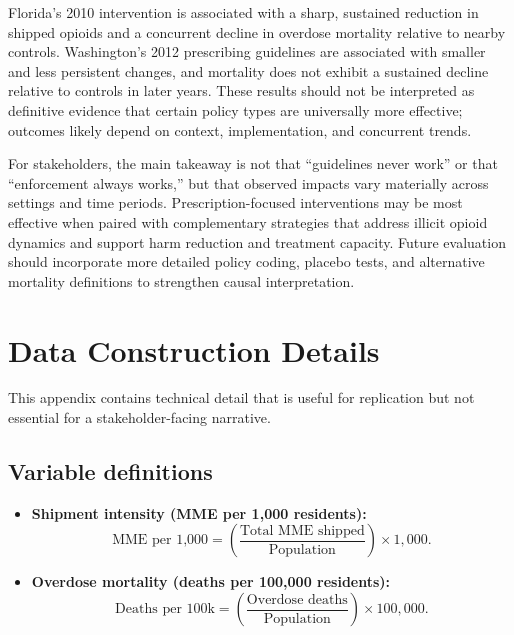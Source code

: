 \documentclass[11pt]{article}
\begin{document}
Florida's 2010 intervention is associated with a sharp, sustained reduction in shipped opioids and a concurrent decline in overdose mortality relative to nearby controls. Washington's 2012 prescribing guidelines are associated with smaller and less persistent changes, and mortality does not exhibit a sustained decline relative to controls in later years. These results should not be interpreted as definitive evidence that certain policy types are universally more effective; outcomes likely depend on context, implementation, and concurrent trends.

For stakeholders, the main takeaway is not that ``guidelines never work'' or that ``enforcement always works,'' but that observed impacts vary materially across settings and time periods. Prescription-focused interventions may be most effective when paired with complementary strategies that address illicit opioid dynamics and support harm reduction and treatment capacity. Future evaluation should incorporate more detailed policy coding, placebo tests, and alternative mortality definitions to strengthen causal interpretation.

\newpage
\appendix

\section{Data Construction Details}
\label{app:data}

This appendix contains technical detail that is useful for replication but not essential for a stakeholder-facing narrative.

\subsection{Variable definitions}

\begin{itemize}[leftmargin=*]
    \item \textbf{Shipment intensity (MME per 1{,}000 residents):}
    \[
        \text{MME per 1{,}000} = \left(\frac{\text{Total MME shipped}}{\text{Population}}\right)\times 1{,}000.
    \]
    \item \textbf{Overdose mortality (deaths per 100{,}000 residents):}
    \[
        \text{Deaths per 100k} = \left(\frac{\text{Overdose deaths}}{\text{Population}}\right)\times 100{,}000.
    \]
\end{itemize}
\end{document}

